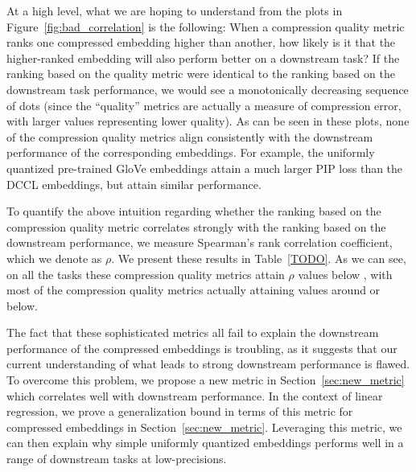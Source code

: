 At a high level, what we are hoping to understand from the plots in Figure~\ref{fig:bad_correlation} is the following:
When a compression quality metric ranks one compressed embedding higher than another, how likely is it that the higher-ranked embedding will also perform better on a downstream task?
If the ranking based on the quality metric were identical to the ranking based on the downstream task performance, we would see a monotonically decreasing sequence of dots (since the ``quality'' metrics are actually a measure of compression error, with larger values representing lower quality).
As can be seen in these plots, none of the compression quality metrics align consistently with the downstream performance of the corresponding embeddings.
For example, the uniformly quantized pre-trained GloVe embeddings attain a much larger PIP loss than the DCCL embeddings, but attain similar performance.

To quantify the above intuition regarding whether the ranking based on the compression quality metric correlates strongly with the ranking based on the downstream performance, we measure Spearman's rank correlation coefficient, which we denote as $\rho$.
We present these results in Table~\ref{TODO}.
As we can see, on all the tasks these compression quality metrics attain $\rho$ values below , with most of the compression quality metrics actually attaining values around  or below.

The fact that these sophisticated metrics all fail to explain the downstream performance of the compressed embeddings is troubling, as it suggests that our current understanding of what leads to strong downstream performance is flawed.
To overcome this problem, we propose a new metric in Section~\ref{sec:new_metric} which correlates well with downstream performance. In the context of linear regression, we prove a generalization bound in terms of this metric for compressed embeddings in Section~\ref{sec:new_metric}.
Leveraging this metric, we can then explain why simple uniformly quantized embeddings performs well in a range of downstream tasks at low-precisions.


